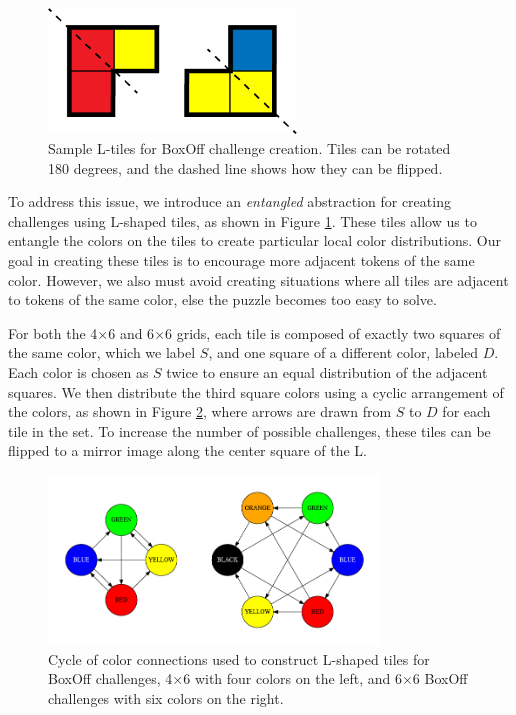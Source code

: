 \documentclass[journal]{IEEEtran}
\begin{document}
\begin{figure}[t]
\centering
\includegraphics[width=6.6cm]{boxoffltiles.png}
\caption{Sample L-tiles for BoxOff challenge creation. Tiles can be rotated 180 degrees, and the dashed line shows how they can be flipped. }
\label{fig:ltiles}
\end{figure}


To address this issue, we introduce an {\it entangled} abstraction for creating challenges using L-shaped tiles, as shown in Figure \ref{fig:ltiles}. These tiles allow us to entangle the colors on the tiles to create particular local color distributions.
Our goal in creating these tiles is to encourage more adjacent tokens of the same color. However, we also must avoid creating situations where all tiles are adjacent to tokens of the same color, else the puzzle becomes too easy to solve. 

For both the 4$\times$6 and 6$\times$6 grids, each tile is composed of exactly two squares of the same color, which we label $S$, and one square of a different color, labeled $D$. Each color is chosen as $S$ twice to ensure an equal distribution of the adjacent squares. We then distribute the third square colors using a cyclic arrangement of the colors, as shown in Figure \ref{fig:boxoffcycle}, where arrows are drawn from $S$ to $D$ for each tile in the set.  To increase the number of possible challenges, these tiles can be flipped to a mirror image along the center square of the L.

\begin{figure}[t]
\centering
\includegraphics[width=8.8cm]{boxoffcycle.png}
\caption{Cycle of color connections used to construct L-shaped tiles for BoxOff challenges, 4$\times$6 with four colors on the left, and 6$\times$6 BoxOff challenges with six colors on the right.}
\label{fig:boxoffcycle}
\end{figure}
\end{document}
